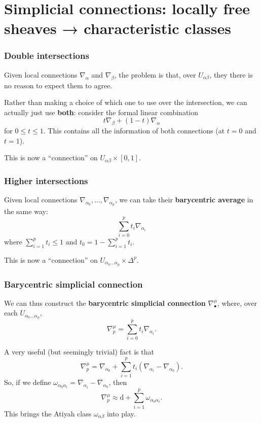 \documentclass{beamer}
\begin{document}
\section{Simplicial connections: locally free sheaves → characteristic classes}

  \begin{frame}\frametitle{Double intersections}
    Given local connections $\nabla_\alpha$ and $\nabla_\beta$, the problem is that, over $U_{\alpha\beta}$, they there is no reason to expect them to agree.

    \pause

    Rather than making a choice of which one to use over the intersection, we can actually just use \textbf{both}: consider the formal linear combination
    \[
      t\nabla_\beta + (1-t)\nabla_\alpha
    \]
    for $0\leqslant t\leqslant1$.
    This contains all the information of both connections (at $t=0$ and $t=1$).

    \pause

    This is now a ``connection'' on $U_{\alpha\beta}\times[0,1]$.
  \end{frame}

  \begin{frame}\frametitle{Higher intersections}
    Given local connections $\nabla_{\alpha_0},\ldots,\nabla_{\alpha_p}$, we can take their \textbf{barycentric average} in the same way:
    \[
      \sum_{i=0}^p t_i \nabla_{\alpha_i}
    \]
    where $\sum_{i=1}^p t_i\leqslant1$ and $t_0=1-\sum_{i=1}^p t_i$.

    \pause

    This is now a ``connection'' on $U_{\alpha_0\ldots\alpha_p}\times\Delta^p$.
  \end{frame}

  \begin{frame}\frametitle{Barycentric simplicial connection}
    We can thus construct the \textbf{barycentric simplicial connection} $\nabla_\bullet^\mu$, where, over each $U_{\alpha_0\ldots\alpha_p}$,
    \[
      \nabla_p^\mu = \sum_{i=0}^p t_i\nabla_{\alpha_i}.
    \]

    \pause

    A very useful (but seemingly trivial) fact is that
    \[
      \nabla_p^\mu = \nabla_{\alpha_0} + \sum_{i=1}^p t_i(\nabla_{\alpha_i}-\nabla_{\alpha_0}).
    \]
    \pause
    So, if we define $\omega_{\alpha_0\alpha_i} = \nabla_{\alpha_i}-\nabla_{\alpha_0}$, then
    \[
      \nabla_p^\mu \approx \mathrm{d} + \sum_{i=1}^p \omega_{\alpha_0\alpha_i}.
    \]
    \pause
    This brings the Atiyah class $\omega_{\alpha\beta}$ into play.
  \end{frame}
\end{document}
